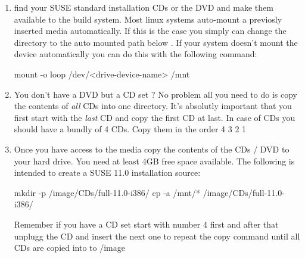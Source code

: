 \begin{enumerate}
\item find your SUSE standard installation CDs or the DVD and
      make them available to the build system. Most linux systems
      auto-mount a previosly inserted media automatically. If this
      is the case you simply can change the directory to the
      auto mounted path below . If your system doesn't mount
      the device automatically you can do this with the following
      command:

\begin{Command}{12cm}
mount -o loop /dev/<drive-device-name> /mnt
\end{Command}

\item You don't have a DVD but a CD set ? No problem all you need to
      do is copy the contents of \emph{all} CDs into one directory. It's
      absolutly important that you first start with the \emph{last} CD and
      copy the first CD at last. In case of CDs you should have a
      bundly of 4 CDs. Copy them in the order 4 3 2 1

\item Once you have access to the media copy the contents of the
      CDs / DVD to your hard drive. You need at least 4GB free
      space available. The following is intended to create a SUSE
      11.0 installation source:

\begin{Command}{12cm}
mkdir -p /image/CDs/full-11.0-i386/
cp -a /mnt/* /image/CDs/full-11.0-i386/
\end{Command}

      Remember if you have a CD set start with number 4 first and
      after that unplugg the CD and insert the next one to repeat
      the copy command until all CDs are copied into to /image
\end{enumerate}
